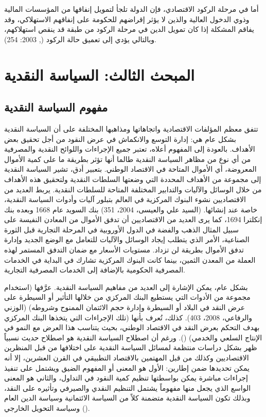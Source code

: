 \documentclass[10pt,a4paper]{report}
\begin{document}
\begin{doublespacing}
أما في مرحلة الركود الاقتصادي، فإن الدولة تلجأ لتمويل إنفاقها من المؤسسات المالية وذوي الدخول العالية والذين لا يؤثر إقراضهم للحكومة على إنفاقهم الاستهلاكي، وقد يفاقم المشكلة إذا كان تمويل الدين في مرحلة الركود من طبقة قد ينقص استهلاكهم، وبالتالي يؤدي إلى تعميق حالة الركود (, 2003: 254).
\section{المبحث الثالث: السياسة النقدية}
\subsection{مفهوم السياسة النقدية}
تتفق معظم المؤلفات الاقتصادية واتجاهاتها ومذاهبها المختلفة على أن السياسة النقدية بشكل عام هي: إدارة التوسع والانكماش في عرض النقود من أجل تحقيق بعض الأهداف. بالعودة إلى المفهوم أعلاه، تعتبر جميع الإجراءات واللوائح النقدية والمصرفية من أي نوع من مظاهر السياسة النقدية طالما أنها تؤثر بطريقة ما على كمية الأموال المعروضة، أي الأموال المتاحة في الاقتصاد الوطني. بتعبير أدق، تشير السياسة النقدية إلى مجموعة من الأهداف المحددة التي وضعتها السلطات النقدية ولتحقيق هذه الأهداف من خلال الوسائل والآليات والتدابير المختلفة المتاحة للسلطات النقدية. يربط العديد من الاقتصاديين نشوء البنوك المركزية في العالم بتبلور آليات وأدوات السياسة النقدية، خاصة عند إنشائها. (السيد علي والعيسى، 2004، 351) بنك السويد عام 1668 وبعده بنك إنكلترا 1694، كما يرى العديد من الاقتصاديين أن تدفق الأموال من المعادن النفيسة على سبيل المثال الذهب والفضة في الدول الأوروبية في المرحلة التجارية قبل الثورة الصناعية، الأمر الذي يتطلب إيجاد الوسائل والآليات للتعامل مع الوضع الجديد وإدارة تدفق الأموال بطريقة لن تزداد. مستويات الأسعار مع ضمان التدفق المستمر لهذه العملة من المعدن الثمين، بينما كانت البنوك المركزية تشارك في البداية في الخدمات المصرفية الحكومية بالإضافة إلى الخدمات المصرفية التجارية.

بشكل عام، يمكن الإشارة إلى العديد من مفاهيم السياسة النقدية. عرَّفها (استخدام مجموعة من الأدوات التي يستطيع البنك المركزي من خلالها التأثير أو السيطرة على عرض النقد في البلاد أو السيطرة وإدارة حجم الائتمان الممنوح وشروطه) (الوزني والرفاعي، 2008، 403). كذلك، تُعرف بأنها (تلك الإجراءات التي يتخذها البنك المركزي بهدف التحكم بعرض النقد في الاقتصاد الوطني، بحيث يتناسب هذا العرض مع النمو في الإنتاج السلعي والخدمي) (). ورغم أن اصطلاح السياسة النقدية هو اصطلاح حديث نسبياً ظهر بشكل دراسات منتظمة لمسائل السياسة النقدية على اختلافها من قبل المنظرين الاقتصاديين وكذلك من قبل المهتمين بالاقتصاد التطبيقي في القرن العشرين، إلا أنه يمكن تحديدها ضمن إطارين: الأول هو المعنى أو المفهوم الضيق ويشتمل على تنفيذ إجراءات مباشرة يمكن بواسطتها تنظيم كمية النقود في التداول، والثاني هو المعنى الواسع الذي يجعل منها مفهوماً يشتمل التنظيم النقدي والصيرفي وتأثيره على النقد، وبذلك تكون السياسة النقدية متضمنة كلاً من السياسة الائتمانية وسياسة الدين العام وسياسة التحويل الخارجي ().


\end{doublespacing}
\end{document}
